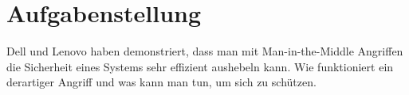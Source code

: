 \section*{Aufgabenstellung}
Dell und Lenovo haben demonstriert, dass man mit Man-in-the-Middle
Angriffen die Sicherheit eines Systems sehr effizient aushebeln kann.
Wie funktioniert ein derartiger Angriff und was kann man tun, um sich
zu schützen.
